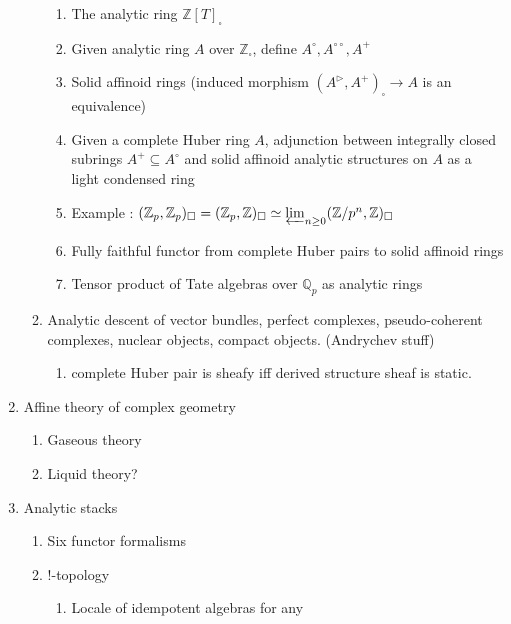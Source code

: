 \documentclass{article}
\begin{document}
\begin{enumerate}
\begin{enumerate}
        \begin{enumerate}
            \item The analytic ring $\mathbb{Z}[T]_\square$
            \item Given analytic ring $A$ over $\mathbb{Z}_\square$,
            define $A^\circ, A^{\circ\circ} , A^+$
            \item Solid affinoid rings (induced morphism $(A^\triangleright , A^+)_\square \to A$ is an equivalence)
            \item Given a complete Huber ring $A$, adjunction
            between integrally closed subrings $A^+ \subseteq A^\circ$ and
            solid affinoid analytic structures on $A$ as a light condensed ring
            \item Example : $(\mathbb{Z}_p , \mathbb{Z}_p)_\square
            = (\mathbb{Z}_p , \mathbb{Z})_\square \simeq \varprojlim_{n \geq 0} (\mathbb{Z} / p^n , \mathbb{Z})_\square$
            \item Fully faithful functor from complete Huber pairs
            to solid affinoid rings
            \item Tensor product of Tate algebras over $\mathbb{Q}_p$ as analytic rings
        \end{enumerate}
        \item Analytic descent of vector bundles, perfect complexes,
        pseudo-coherent complexes, nuclear objects, compact objects.
        (Andrychev stuff)
        \begin{enumerate}
            \item complete Huber pair is sheafy iff derived structure sheaf is static.
        \end{enumerate}
    \end{enumerate}
    \item Affine theory of complex geometry
    \begin{enumerate}
        \item Gaseous theory 
        \item Liquid theory?
    \end{enumerate}
    \item Analytic stacks
    \begin{enumerate}
        \item Six functor formalisms
        \item !-topology
        \begin{enumerate}
            \item Locale of idempotent algebras for any

\end{enumerate}
\end{enumerate}
\end{enumerate}
\end{document}
